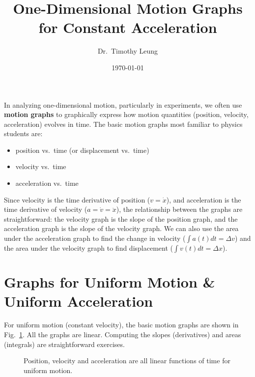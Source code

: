 \documentclass{../../../oss-handout}
\title{One-Dimensional Motion Graphs for Constant Acceleration}
\author{Dr.\ Timothy Leung}
\date{\today}
\begin{document}
\thispagestyle{title}
\gentitle

In analyzing one-dimensional motion, particularly in experiments, we often use
\textbf{motion graphs} to graphically express how motion quantities (position,
velocity, acceleration) evolves in time. The basic motion graphs most familiar
to physics students are:
\begin{itemize}[nosep]
\item position vs.\ time (or displacement vs.\ time)
\item velocity vs.\ time
\item acceleration vs.\ time
\end{itemize}
Since velocity is the time derivative of position ($v=\dot{x}$), and
acceleration is the time derivative of velocity ($a=\dot{v}=\ddot{x}$), the
relationship between the graphs are straightforward: the velocity graph is the
slope of the position graph, and the acceleration graph is the slope of the
velocity graph. We can also use the area under the acceleration graph to find
the change in velocity ($\int a(t)dt=\Delta v$) and the area under the velocity
graph to find displacement ($\int v(t)dt=\Delta x$).

\section{Graphs for Uniform Motion \& Uniform Acceleration}
For uniform motion (constant velocity), the basic motion graphs are shown in
Fig.~\ref{uniform-motion}. All the graphs are linear. Computing the slopes
(derivatives) and areas (integrals) are straightforward exercises.
\begin{figure}[!ht]
  \centering
  \hspace{.15in}
  \hspace{.15in}
  \caption{Position, velocity and acceleration are all linear functions of time
    for uniform motion.}
  \label{uniform-motion}
\end{figure}
\end{document}
